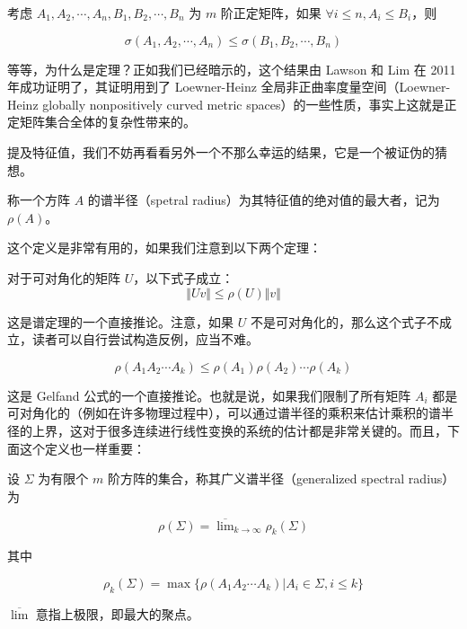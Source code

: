 \begin{theorem}
    考虑 $A_1, A_2, \cdots, A_n, B_1, B_2, \cdots, B_n$ 为 $m$ 阶正定矩阵，如果 $\forall i \leqslant n, A_i \leqslant B_i$，则

    \[
    \sigma(A_1, A_2, \cdots, A_n) \leqslant \sigma(B_1, B_2, \cdots, B_n)
    \]
\end{theorem}

等等，为什么是定理？正如我们已经暗示的，这个结果由 Lawson 和 Lim 在 2011 年成功证明了，其证明用到了 Loewner-Heinz 全局非正曲率度量空间（Loewner-Heinz globally nonpositively curved metric spaces）的一些性质，事实上这就是正定矩阵集合全体的复杂性带来的。

提及特征值，我们不妨再看看另外一个不那么幸运的结果，它是一个被证伪的猜想。

\begin{definition}
    称一个方阵 $A$ 的谱半径（spetral radius）为其特征值的绝对值的最大者，记为 $\rho(A)$。
\end{definition}

这个定义是非常有用的，如果我们注意到以下两个定理：

\begin{theorem}
    对于可对角化的矩阵 $U$，以下式子成立：
    \[
    \Vert Uv \Vert \leqslant \rho(U) \Vert v \Vert
    \]
\end{theorem}

这是谱定理的一个直接推论。注意，如果 $U$ 不是可对角化的，那么这个式子不成立，读者可以自行尝试构造反例，应当不难。

\begin{theorem}
    \[
    \rho(A_1A_2\cdots A_k) \leqslant \rho(A_1)\rho(A_2)\cdots \rho(A_k)
    \]
\end{theorem}

这是 Gelfand 公式的一个直接推论。也就是说，如果我们限制了所有矩阵 $A_i$ 都是可对角化的（例如在许多物理过程中），可以通过谱半径的乘积来估计乘积的谱半径的上界，这对于很多连续进行线性变换的系统的估计都是非常关键的。而且，下面这个定义也一样重要：

\begin{definition}
    设 $\Sigma$ 为有限个 $m$ 阶方阵的集合，称其广义谱半径（generalized spectral radius）为

    \[
    \rho(\Sigma) = \overline\lim_{k \to \infty} \rho_k(\Sigma)
    \]

    其中

    \[
    \rho_k(\Sigma) = \max\{\rho(A_1A_2 \cdots A_k) | A_i \in \Sigma, i \leqslant k\}
    \]

    $\overline\lim$ 意指上极限，即最大的聚点。
\end{definition}

